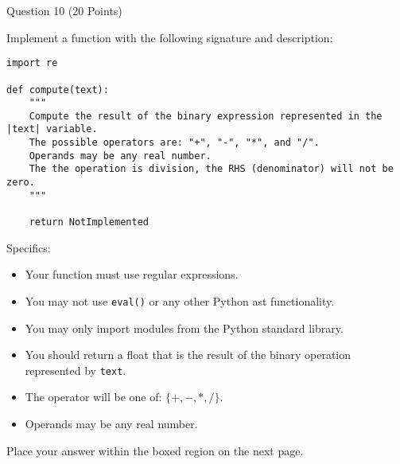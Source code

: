 \documentclass{article}
\newcommand*{\calcremainingheight}{%
    \ifdim\pagegoal=\maxdimen
        \remainingheight\dimexpr\textheight-0.4pt\relax
    \else
        \remainingheight\dimexpr\pagegoal-\pagetotal-\lineskip-0.4pt\relax
    \fi
}
\begin{document}

\vspace{2cm}


\begin{minipage}{\textwidth}
    \noindent
    Question 10 (20 Points)
    \vspace{0.5cm}

    \noindent
    Implement a function with the following signature and description:

    \begin{lstlisting}
import re

def compute(text):
    """
    Compute the result of the binary expression represented in the |text| variable.
    The possible operators are: "+", "-", "*", and "/".
    Operands may be any real number.
    The the operation is division, the RHS (denominator) will not be zero.
    """

    return NotImplemented
    \end{lstlisting}

    Specifics:
    \begin{itemize}
        \item Your function must use regular expressions.
        \item You may not use \verb|eval()| or any other Python ast functionality.
        \item You may only import modules from the Python standard library.
        \item You should return a float that is the result of the binary operation represented by \verb|text|.
        \item The operator will be one of:  $ \{+, -, *, /\} $.
        \item Operands may be any real number.
    \end{itemize}

    \vspace{0.25cm}
    Place your answer within the boxed region on the next page.
    \vspace{0.25cm}

\end{minipage}
\newpage
\begin{minipage}{\textwidth}
    \calcremainingheight

\end{minipage}

\end{document}
